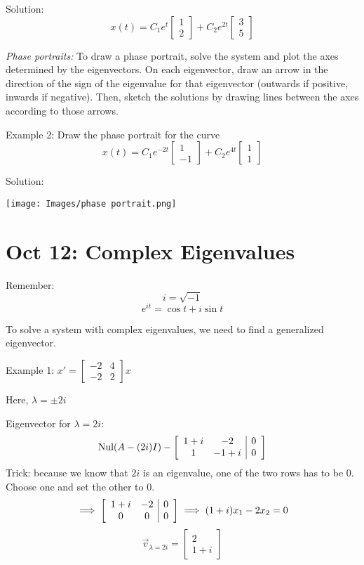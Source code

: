 \documentclass[12pt]{article}
\begin{document}
Solution:
\[\boxed{x(t) = C_1 e^{t} \begin{bmatrix}
    1\\2
\end{bmatrix} + C_2 e^{2t} \begin{bmatrix}
    3\\5
\end{bmatrix}}\]

\emph{Phase portraits:}
To draw a phase portrait, solve the system and plot the axes determined by the eigenvectors. On each eigenvector, draw an arrow in the direction of the sign of the eigenvalue for that eigenvector (outwards if positive, inwards if negative). Then, sketch the solutions by drawing lines between the axes according to those arrows.

Example 2: Draw the phase portrait for the curve 
\[x(t) = C_1 e^{-2t} \begin{bmatrix}
    1\\-1
\end{bmatrix}+ C_2 e^{4t} \begin{bmatrix}
    1\\1
\end{bmatrix}\]

Solution:

\texttt{[image: Images/phase portrait.png]}

\section{Oct 12: Complex Eigenvalues}
Remember:
\[i = \sqrt{-1}\]
\[e^{it} = \cos t + i \sin t\]

To solve a system with complex eigenvalues, we need to find a generalized eigenvector. 

Example 1: $x' = \begin{bmatrix}
    -2 & 4\\
    -2 & 2
\end{bmatrix} x$

Here, $\lambda = \pm 2i$

Eigenvector for $\lambda = 2i$:
\[\text{Nul}(A- (2i)I) - \left[\begin{array}{c c | c}
    1 + i & -2 & 0\\
    1 & -1 + i & 0
\end{array}\right]\]
Trick: because we know that $2i$ is an eigenvalue, one of the two rows has to be 0. Choose one and set the other to 0. 
\[\implies \left[\begin{array}{c c | c}
    1 + i & -2 & 0\\
    0 & 0 & 0
\end{array}\right] \implies (1+ i)x_1 -2x_2 = 0\]
\[\vec{v}_{\lambda = 2i} = \begin{bmatrix}
    2\\
    1 + i
\end{bmatrix}\]
\end{document}
